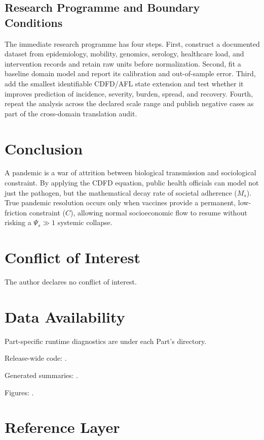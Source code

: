 \documentclass[11pt,a4paper]{article}
\begin{document}
\subsection{Research Programme and Boundary Conditions}

The immediate research programme has four steps. First, construct a documented
dataset from epidemiology, mobility, genomics, serology, healthcare load, and intervention records and retain raw units before normalization.
Second, fit a baseline domain model and report its calibration and out-of-sample
error. Third, add the smallest identifiable CDFD/AFL state extension and test
whether it improves prediction of incidence, severity, burden, spread, and recovery. Fourth, repeat the
analysis across the declared scale range and publish negative cases as part of
the cross-domain translation audit.


\section{Conclusion}
A pandemic is a war of attrition between biological transmission and sociological constraint. By applying the CDFD equation, public health officials can model not just the pathogen, but the mathematical decay rate of societal adherence ($M_s$). True pandemic resolution occurs only when vaccines provide a permanent, low-friction constraint ($C$), allowing normal socioeconomic flow to resume without risking a $\Psi_s \gg 1$ systemic collapse.
\section*{Conflict of Interest} The author declares no conflict of interest.
\section*{Data Availability}
Part-specific runtime diagnostics are under each Part's  directory.

Release-wide code: .

Generated summaries: .

Figures: .


\section{Reference Layer}


\end{document}
